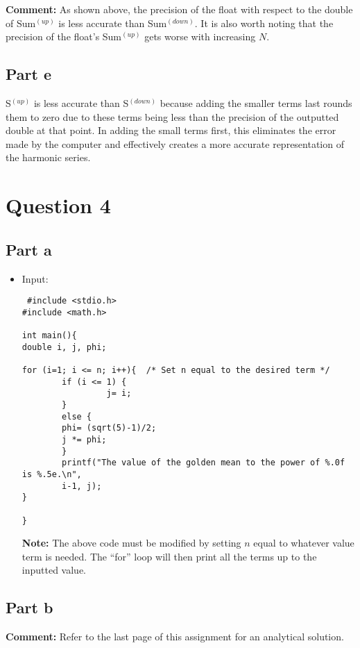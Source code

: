 \documentclass[10pt]{article}
\begin{document}
\textbf{Comment:} As shown above, the precision of the float with respect to the double of Sum$^{(up)}$ is less accurate than Sum$^{(down)}$. It is also worth noting that the precision of the float's Sum$^{(up)}$ gets worse with increasing $N$. 
\subsection{Part e}
S$^{(up)}$ is less accurate than S$^{(down)}$ because adding the smaller terms last rounds them to zero due to these terms being less than the precision of the outputted double at that point. In adding the small terms first, this eliminates the error made by the computer and effectively creates a more accurate representation of the harmonic series.
\section{Question 4}
\subsection{Part a}
\begin{itemize}
\item Input:
\begin{verbatim}
 #include <stdio.h>
#include <math.h>

int main(){
double i, j, phi;

for (i=1; i <= n; i++){  /* Set n equal to the desired term */
        if (i <= 1) {
                 j= i;
        }
        else {
        phi= (sqrt(5)-1)/2;
        j *= phi;
        }
        printf("The value of the golden mean to the power of %.0f is %.5e.\n",
        i-1, j);
}

}
\end{verbatim}\textbf{Note:} The above code must be modified by setting $n$ equal to whatever value term is needed. The ``for'' loop will then print all the terms up to the inputted value.
\end{itemize}
\subsection{Part b}
\textbf{Comment:} Refer to the last page of this assignment for an analytical solution.
\end{document}
